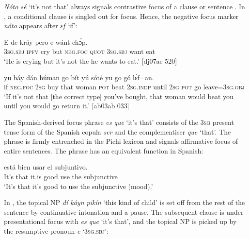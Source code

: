 \textit{Nóto sé} ‘it’s not that’ always signals contrastive focus of a clause or sentence . In , a conditional clause is singled out for focus. Hence, the negative focus marker \textit{nóto} appears after \textit{ɛf} ‘if’:


\ea%
    \label{ex:key:711}
    \gll E    de  kráy    pero        e    wánt  chɔ́p.\\
\textsc{3sg.sbj}  \textsc{ipfv}  cry    but    \textsc{neg}.\textsc{foc}  \textsc{quot}    \textsc{3sg.sbj}  want  eat\\

\glt ‘He is crying but it’s not the he wants to eat.’ [dj07ae 520]
\z


\ea%
    \label{ex:key:712}
    \gll {}    yu  báy  dán  húman  go  bít    yú    sóté  
yu  go  gó  lɛ́f=an.\\
if  \textsc{neg}.\textsc{foc}  \textsc{2sg}  buy  that  woman  \textsc{pot}  beat    \textsc{2sg.indp}  until
\textsc{2sg}  \textsc{pot}  go  leave=\textsc{3sg.obj}\\

\glt ‘If it’s not that [the correct type] you’ve bought, that woman 
would beat you until you would go return it.’ [ab03ab 033]
\z

The Spanish-derived focus phrase \textit{es que} ‘it’s that’ consists of the \textsc{3sg} present tense form of the Spanish copula \textit{ser} and the complementiser \textit{que} ‘that’. The phrase is firmly entrenched in the Pichi lexicon and signals affirmative focus of entire sentences. The phrase has an equivalent function in Spanish:


\ea%
    \label{ex:key:713}
    \gll {}     está    bien    usar    el  subjuntivo.\\
It’s  that    it.is    good  use    the  subjunctive\\

\glt ‘It’s that it’s good to use the subjunctive (mood).’
\z

In , the topical \textsc{NP} \textit{dí káyn pikín} ‘this kind of child’ is set off from the rest of the sentence by continuative intonation and a pause. The subsequent clause is under presentational focus with\textit{ es que} ‘it’s that’, and the topical \textsc{NP} is picked up by the resumptive pronoun \textit{e} ‘\textsc{3sg.sbj}’:



